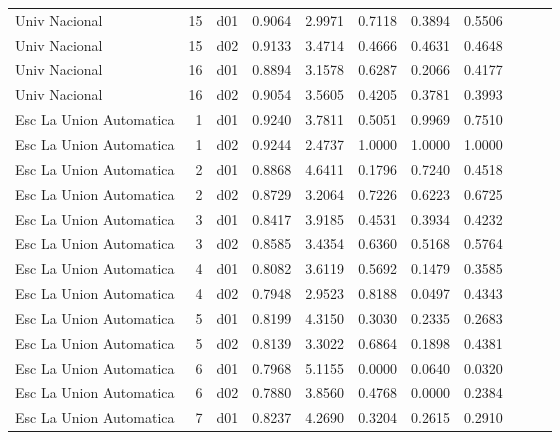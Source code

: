 \begin{landscape}
\begin{longtable}{p{2cm}rrrrrrrrrr}
           Univ Nacional  &         15 &     d01 &   0.9064 &  2.9971 &        0.7118 &           0.3894 &  0.5506 \\
           Univ Nacional  &         15 &     d02 &   0.9133 &  3.4714 &        0.4666 &           0.4631 &  0.4648 \\
           Univ Nacional  &         16 &     d01 &   0.8894 &  3.1578 &        0.6287 &           0.2066 &  0.4177 \\
           Univ Nacional  &         16 &     d02 &   0.9054 &  3.5605 &        0.4205 &           0.3781 &  0.3993 \\
  Esc La Union Automatica &          1 &     d01 &   0.9240 &  3.7811 &        0.5051 &           0.9969 &  0.7510 \\
  Esc La Union Automatica &          1 &     d02 &   0.9244 &  2.4737 &        1.0000 &           1.0000 &  1.0000 \\
  Esc La Union Automatica &          2 &     d01 &   0.8868 &  4.6411 &        0.1796 &           0.7240 &  0.4518 \\
  Esc La Union Automatica &          2 &     d02 &   0.8729 &  3.2064 &        0.7226 &           0.6223 &  0.6725 \\
  Esc La Union Automatica &          3 &     d01 &   0.8417 &  3.9185 &        0.4531 &           0.3934 &  0.4232 \\
  Esc La Union Automatica &          3 &     d02 &   0.8585 &  3.4354 &        0.6360 &           0.5168 &  0.5764 \\
  Esc La Union Automatica &          4 &     d01 &   0.8082 &  3.6119 &        0.5692 &           0.1479 &  0.3585 \\
  Esc La Union Automatica &          4 &     d02 &   0.7948 &  2.9523 &        0.8188 &           0.0497 &  0.4343 \\
  Esc La Union Automatica &          5 &     d01 &   0.8199 &  4.3150 &        0.3030 &           0.2335 &  0.2683 \\
  Esc La Union Automatica &          5 &     d02 &   0.8139 &  3.3022 &        0.6864 &           0.1898 &  0.4381 \\
  Esc La Union Automatica &          6 &     d01 &   0.7968 &  5.1155 &        0.0000 &           0.0640 &  0.0320 \\
  Esc La Union Automatica &          6 &     d02 &   0.7880 &  3.8560 &        0.4768 &           0.0000 &  0.2384 \\
  Esc La Union Automatica &          7 &     d01 &   0.8237 &  4.2690 &        0.3204 &           0.2615 &  0.2910 \\

\end{longtable}
\end{landscape}
